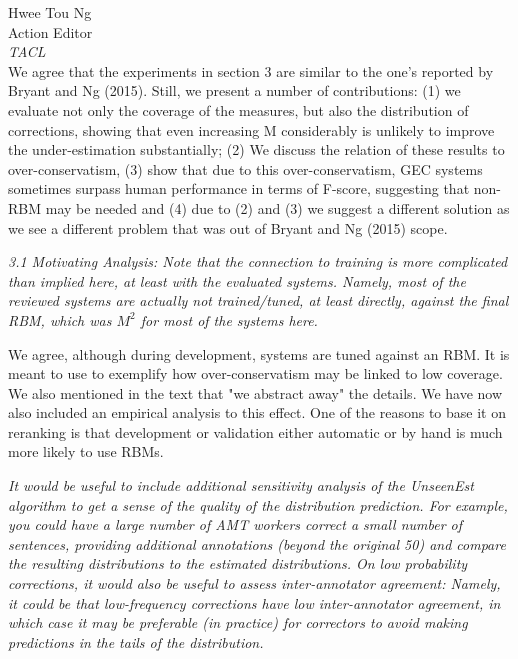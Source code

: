 \documentclass[11pt,letterpaper]{letter}
\begin{document}
\begin{letter}{%
Hwee Tou Ng\\
Action Editor\\
{\em TACL}\\
}
We agree that the experiments in section 3 are similar to the one's reported by Bryant and Ng (2015). Still, we present a number of contributions: (1) we evaluate not only the coverage of the measures, but also the distribution of corrections, showing that even increasing M considerably is unlikely to improve the under-estimation substantially; (2) We discuss the relation of these results to over-conservatism, (3) show that due to this over-conservatism, GEC systems sometimes surpass human performance in terms of F-score, suggesting that non-RBM may be needed and (4) due to (2) and (3) we suggest a different solution as we see a different problem that was out of Bryant and Ng (2015) scope.

\emph{3.1 Motivating Analysis: Note that the connection to training is more
	complicated than implied here, at least with the evaluated systems. Namely,
	most of the reviewed systems are actually not trained/tuned, at least
	directly, against the final RBM, which was $M^2$ for most of the systems here.
	}
	
	We agree, although during development, systems are tuned against an RBM. It is meant to use to exemplify how over-conservatism may be linked to low coverage. We also mentioned in the text that "we abstract away" the details. We have now also included an empirical analysis to this effect. One of the reasons to base it on reranking is that development or validation either automatic or by hand is much more likely to use RBMs.
	
	\emph{It would be useful to include additional sensitivity analysis of the
		UnseenEst algorithm to get a sense of the quality of the distribution
		prediction. For example, you could have a large number of AMT workers
		correct a small number of sentences, providing additional annotations
		(beyond the original 50) and compare the resulting distributions to the
		estimated distributions. On low probability corrections, it would also be
		useful to assess inter-annotator agreement: Namely, it could be that
		low-frequency corrections have low inter-annotator agreement, in which case
		it may be preferable (in practice) for correctors to avoid making
		predictions in the tails of the distribution.
		}
		

\end{letter}
\end{document}
